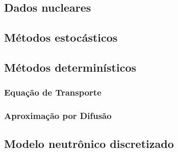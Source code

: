 \subsection{Dados nucleares}
\label{subsec:dn}

\subsection{Métodos estocásticos}
\label{subsec:mc}

\subsection{Métodos determinísticos}
\label{subsec:det}

\subsubsection{Equação de Transporte}
\label{ssubsec:transp}

\subsubsection{Aproximação por Difusão}
\label{ssubsec:difusao}

\subsection{Modelo neutrônico discretizado}
\label{subsec:modelon}
